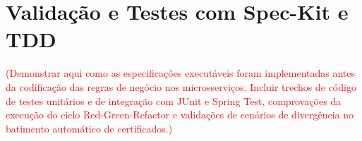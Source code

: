 \section{Validação e Testes com Spec-Kit e TDD}

\textcolor{red}{(Demonstrar aqui como as especificações executáveis foram implementadas antes da codificação das regras de negócio nos microsserviços. Incluir trechos de código de testes unitários e de integração com JUnit e Spring Test, comprovações da execução do ciclo Red-Green-Refactor e validações de cenários de divergência no batimento automático de certificados.)}
